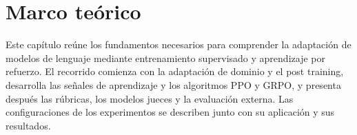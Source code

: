 \chapter{Marco teórico}
\label{ch:marco-teorico}
Este capítulo reúne los fundamentos necesarios para comprender la adaptación de modelos de lenguaje mediante entrenamiento supervisado y aprendizaje por refuerzo. El recorrido comienza con la adaptación de dominio y el post training, desarrolla las señales de aprendizaje y los algoritmos PPO y GRPO, y presenta después las rúbricas, los modelos jueces y la evaluación externa. Las configuraciones de los experimentos se describen junto con su aplicación y sus resultados.

%
%
%
%
%
%

